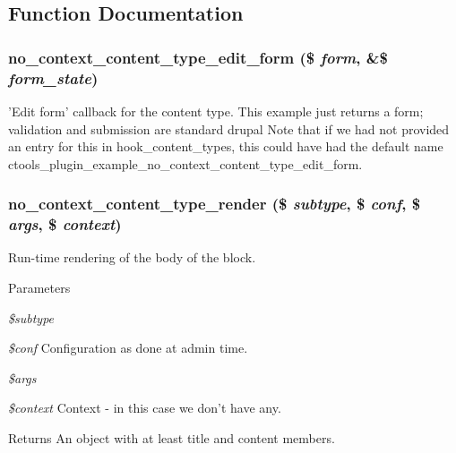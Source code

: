\subsection{Function Documentation}
\hypertarget{no__context__content__type_8inc_ab5b78ebf59abdb3b6568ed492a1b162f}{
\subsubsection[{no\_\-context\_\-content\_\-type\_\-edit\_\-form}]{\setlength{\rightskip}{0pt plus 5cm}no\_\-context\_\-content\_\-type\_\-edit\_\-form (\$ {\em form}, \/  \&\$ {\em form\_\-state})}}
\label{no__context__content__type_8inc_ab5b78ebf59abdb3b6568ed492a1b162f}
'Edit form' callback for the content type. This example just returns a form; validation and submission are standard drupal Note that if we had not provided an entry for this in hook\_\-content\_\-types, this could have had the default name ctools\_\-plugin\_\-example\_\-no\_\-context\_\-content\_\-type\_\-edit\_\-form. \hypertarget{no__context__content__type_8inc_a1df607eb28200db7681b82557042d769}{
\subsubsection[{no\_\-context\_\-content\_\-type\_\-render}]{\setlength{\rightskip}{0pt plus 5cm}no\_\-context\_\-content\_\-type\_\-render (\$ {\em subtype}, \/  \$ {\em conf}, \/  \$ {\em args}, \/  \$ {\em context})}}
\label{no__context__content__type_8inc_a1df607eb28200db7681b82557042d769}
Run-\/time rendering of the body of the block.


\begin{DoxyParams}{Parameters}
\item[{\em \$subtype}]\item[{\em \$conf}]Configuration as done at admin time. \item[{\em \$args}]\item[{\em \$context}]Context -\/ in this case we don't have any.\end{DoxyParams}
\begin{DoxyReturn}{Returns}
An object with at least title and content members. 
\end{DoxyReturn}


